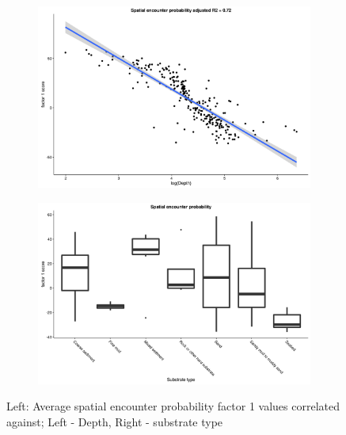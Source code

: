 \documentclass[12pt]{article}
\begin{document}
\begin{linenumbers}
\begin{figure}[!ht]
	\label{fig:S1}
	\begin{subfigure}{0.5\textwidth}
	\includegraphics[width = \linewidth]{"../figures/Factor1_DepthO1"}
\end{subfigure}
\begin{subfigure}{0.5\textwidth}
	\includegraphics[width = \linewidth]{"../figures/Factor1_HabitatO1"}
\end{subfigure}
\caption{Left: Average spatial encounter probability factor 1 values correlated
	against; Left - Depth, Right - substrate type}

\end{figure}


\begin{figure}[!ht]
	\label{fig:S2}
	

\end{figure}
\end{linenumbers}
\end{document}
